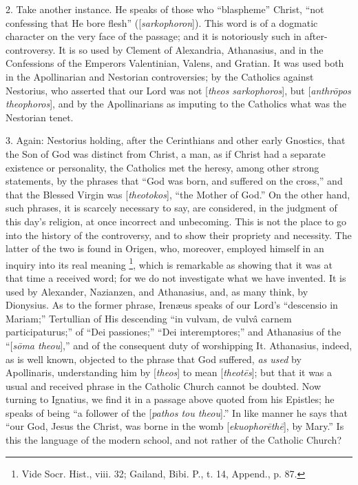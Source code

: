 2. Take another instance. He speaks of those who ``blaspheme''
Christ, ``not confessing that He bore flesh'' ([\emph{sarkophoron}]).
This word is of a dogmatic character on the very face of the passage;
and it is notoriously such in after-controversy. It is so used by
Clement of Alexandria, Athanasius, and in the Confessions of the
Emperors Valentinian, Valens, and Gratian. It was used both in the
Apollinarian and Nestorian controversies; by the Catholics against
Nestorius, who asserted that our Lord was not [\emph{theos sarkophoros}],
but [\emph{anthr\={o}pos theophoros}], and by the Apollinarians as
imputing to the Catholics what was the Nestorian tenet.

3. Again: Nestorius holding, after the
Cerinthians and other early Gnostics, that the Son of God was distinct
from Christ, a man, as if Christ had a separate existence or
personality, the Catholics met the heresy, among other strong
statements, by the phrases that ``God was born, and suffered on the
cross,'' and that the Blessed Virgin was [\emph{theotokos}], ``the
Mother of God.'' On the other hand, such phrases, it is scarcely
necessary to say, are considered, in the judgment of this day's
religion, at once incorrect and unbecoming. This is not the place to
go into the history of the controversy, and to show their propriety
and necessity. The latter of the two is found in Origen, who,
moreover, employed himself in an inquiry into its real meaning \footnote{Vide Socr. Hist., viii. 32; Gailand, Bibi. P., t. 14, Append., p. 87.}, which is remarkable as showing that it was at that time
a received word; for we do not investigate what we have invented. It
is used by Alexander, Nazianzen, and Athanasius, and, as many think,
by Dionysius. As to the former phrase, Irenæus speaks of our Lord's ``descensio
in Mariam;'' Tertullian of His descending ``in vulvam, de vulvâ carnem
participaturus;'' of ``Dei passiones;'' ``Dei interemptores;'' and
Athanasius of the ``[\emph{s\={o}ma theou}],'' and of the consequent duty of
worshipping It. Athanasius, indeed, as is well known, objected to the
phrase that God suffered, \emph{as used} by Apollinaris, understanding
him by [\emph{theos}] to mean [\emph{theot\={e}s}]; but that it was
a usual and received phrase in the Catholic Church cannot be doubted.
Now turning to Ignatius, we find it in a passage above quoted from his
Epistles; he speaks of being ``a follower of the [\emph{pathos tou theou}].''
In like manner he says that ``our God, Jesus the Christ, was borne in
the womb [\emph{ekuophor\={e}th\={e}}], by Mary.'' Is this the
language of the modern school, and not rather of the Catholic Church?

